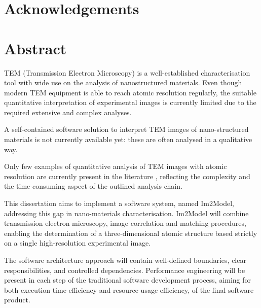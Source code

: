 \documentclass[
  oneside,
  11pt, a4paper,
  footinclude=true,
  headinclude=true,
  cleardoublepage=empty
]{scrbook}
\author{Filipe Costa Oliveira}
\date{\myear} %
\begin{document}
	\umfrontcover	
	\umtitlepage
	
	\chapter*{Acknowledgements}


	\chapter*{Abstract}
	
	
	
	TEM (Transmission Electron Microscopy) is a well-established characterisation tool with wide use on
the analysis of nanostructured materials. Even though modern TEM equipment is able to reach atomic
resolution regularly, the suitable quantitative interpretation of experimental images is currently limited
due to the required extensive and complex analyses.\par 

A self-contained software solution to interpret TEM images of nano-structured materials is not currently available yet: these are often analysed in a qualitative way.



Only few examples of quantitative analysis of TEM images with atomic resolution are
currently present in the literature%
, reflecting the complexity and the time-consuming aspect of the
outlined analysis chain.\par 


This dissertation aims to implement a software system, named Im2Model, addressing this gap in nano-materials
characterisation. Im2Model will combine transmission electron microscopy, image correlation and matching procedures, enabling the determination of a three-dimensional atomic structure based strictly on a single high-resolution experimental image.\par 
The software architecture approach will contain well-defined boundaries, clear responsibilities, and controlled dependencies.
Performance engineering will be present in each step of the traditional software development process, 
aiming for 
both execution time-efficiency and resource usage efficiency, of the final software product.
\end{document}
